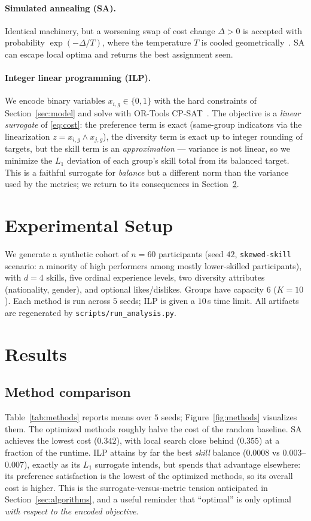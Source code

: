 \documentclass[11pt]{article}
\begin{document}
\paragraph{Simulated annealing (SA).} Identical machinery, but a worsening swap of cost
change $\Delta>0$ is accepted with probability $\exp(-\Delta/T)$, where the temperature $T$
is cooled geometrically~\cite{sa}. SA can escape local optima and returns the best
assignment seen.

\paragraph{Integer linear programming (ILP).} We encode binary variables $x_{i,g}\in\{0,1\}$
with the hard constraints of Section~\ref{sec:model} and solve with OR-Tools CP-SAT~\cite{ortools}. The
objective is a \emph{linear surrogate} of \eqref{eq:cost}: the preference term is exact
(same-group indicators via the linearization $z=x_{i,g}\wedge x_{j,g}$), the diversity term
is exact up to integer rounding of targets, but the skill term is an \emph{approximation} ---
variance is not linear, so we minimize the $L_1$ deviation of each group's skill total from
its balanced target. This is a faithful surrogate for \emph{balance} but a different norm
than the variance used by the metrics; we return to its consequences in
Section~\ref{sec:results}.

\section{Experimental Setup}
We generate a synthetic cohort of $n=60$ participants (seed $42$, \texttt{skewed-skill}
scenario: a minority of high performers among mostly lower-skilled participants), with $d=4$
skills, five ordinal experience levels, two diversity attributes (nationality, gender), and
optional likes/dislikes. Groups have capacity $6$ ($K=10$). Each method is run across $5$
seeds; ILP is given a $10$\,s time limit. All artifacts are regenerated by
\texttt{scripts/run\_analysis.py}.

\section{Results}
\label{sec:results}

\subsection{Method comparison}
Table~\ref{tab:methods} reports means over $5$ seeds; Figure~\ref{fig:methods} visualizes
them. The optimized methods roughly halve the cost of the random baseline. SA achieves the
lowest cost ($0.342$), with local search close behind ($0.355$) at a fraction of the
runtime. ILP attains by far the best \emph{skill} balance ($0.0008$ vs $0.003$--$0.007$),
exactly as its $L_1$ surrogate intends, but spends that advantage elsewhere: its preference
satisfaction is the lowest of the optimized methods, so its overall cost is higher. This is
the surrogate-versus-metric tension anticipated in Section~\ref{sec:algorithms}, and a
useful reminder that ``optimal'' is only optimal \emph{with respect to the encoded
objective}.
\end{document}
